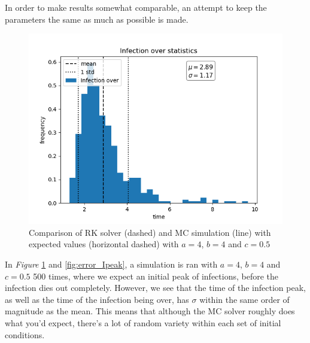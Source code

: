 In order to make results somewhat comparable, an attempt to keep the parameters the same as much as possible is made.
\begin{figure}[!h]
    \centering
    \includegraphics[scale=0.55]{plots/MC_solver_multiple_a_4_b_4_c_0.5500over_I500.png}
    \caption{Comparison of RK solver (dashed) and MC simulation (line) with expected values (horizontal dashed) with $a=4$, $b=4$ and $c=0.5$}
    \label{fig:error_Iover}
\end{figure}

In \textit{Figure} \ref{fig:error_Iover} and \ref{fig:error_Ipeak}, a simulation is ran with $a=4$, $b=4$ and $c=0.5$ 500 times, where we expect an initial peak of infections, before the infection dies out completely.
However, we see that the time of the infection peak, as well as the time of the infection being over, has $\sigma$ within the same order of magnitude as the mean.
This means that although the MC solver roughly does what you'd expect, there's a lot of random variety within each set of initial conditions.

